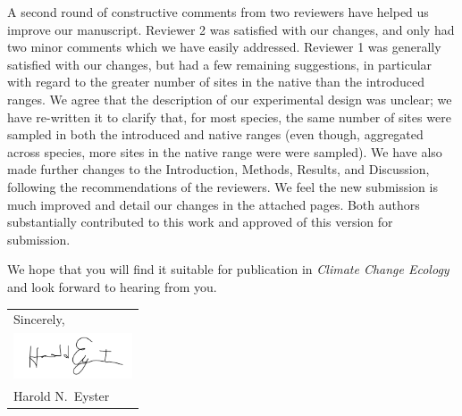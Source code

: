 \documentclass[11pt]{article}
\begin{document}
	A second round of constructive comments from two reviewers have helped us improve our manuscript. Reviewer 2 was satisfied with our changes, and only had two minor comments which we have easily addressed. Reviewer 1 was generally satisfied with our changes, but had a few remaining suggestions, in particular with regard to the greater number of sites in the native than the introduced ranges. We agree that the description of our experimental design was unclear;  we have re-written it to clarify that, for most species, the same number of sites were sampled in both the introduced and native ranges (even though, aggregated across species, more sites in the native range were were sampled). We have also made further changes to the Introduction, Methods, Results, and Discussion, following the recommendations of the reviewers. We feel the new submission is much improved and detail our changes in the attached pages. Both authors substantially contributed to this work and approved of this version for submission.  

We hope that you will find it suitable for publication in \textit{Climate Change Ecology} and look forward to hearing from you. \\  %
	\null\hfill
	\begin{tabular}{l@{}}
		Sincerely, \\[1\normalbaselineskip] %
		\includegraphics[width=100pt]{sig}\\
		Harold N.\ Eyster
	\end{tabular}
	
\end{document}
